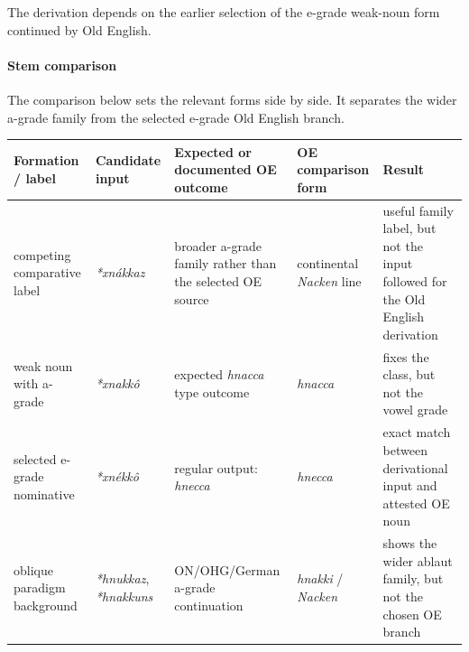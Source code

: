 \documentclass[
  british,
  a4paper,
]{article}
\newcounter{none} %
\begin{document}
The derivation depends on the earlier selection of the e-grade weak-noun
form continued by Old English.

\paragraph{Stem comparison}\label{stem-comparison-3}

The comparison below sets the relevant forms side by side. It separates
the wider a-grade family from the selected e-grade Old English branch.

{\def\LTcaptype{none} %
\begin{longtable}[]{@{}
  >{\raggedright\arraybackslash}p{}
  >{\raggedright\arraybackslash}p{}
  >{\raggedright\arraybackslash}p{}
  >{\raggedright\arraybackslash}p{}
  >{\raggedright\arraybackslash}p{}@{}}
\toprule\noalign{}
\begin{minipage}[b]{\linewidth}\raggedright
Formation / label
\end{minipage} & \begin{minipage}[b]{\linewidth}\raggedright
Candidate input
\end{minipage} & \begin{minipage}[b]{\linewidth}\raggedright
Expected or documented OE outcome
\end{minipage} & \begin{minipage}[b]{\linewidth}\raggedright
OE comparison form
\end{minipage} & \begin{minipage}[b]{\linewidth}\raggedright
Result
\end{minipage} \\
\midrule\noalign{}
\endhead
\bottomrule\noalign{}
\endlastfoot
competing comparative label & {\emph{*xnákkaz}} & broader a-grade family
rather than the selected OE source & continental {\emph{Nacken}} line &
useful family label, but not the input followed for the Old English
derivation \\
weak noun with a-grade & {\emph{*xnakkô}} & expected {\emph{hnacca}}
type outcome & {\emph{hnacca}} & fixes the class, but not the vowel
grade \\
selected e-grade nominative & {\emph{*xnékkô}} & regular output:
{\emph{hnecca}} & {\emph{hnecca}} & exact match between derivational
input and attested OE noun \\
oblique paradigm background & {\emph{*hnukkaz}}, {\emph{*hnakkuns}} &
ON/OHG/German a-grade continuation & {\emph{hnakki}} / {\emph{Nacken}} &
shows the wider ablaut family, but not the chosen OE branch \\
\end{longtable}
}
\end{document}
